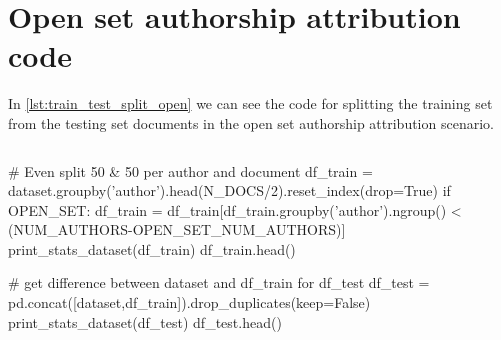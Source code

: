 \section{Open set authorship attribution code}

In \autoref{lst:train_test_split_open} we can see the code for splitting the training set from the testing set documents in the open set authorship attribution scenario.

\begin{lstlisting}[frame=none,caption={Training and Testing set split for open set autorship attribution},captionpos=b,label=lst:train_test_split_open]
\end{lstlisting}
\begin{python}	
	# Even split 50 & 50 per author and document
	df_train = dataset.groupby('author').head(N_DOCS/2).reset_index(drop=True)
	if OPEN_SET:
		df_train = df_train[df_train.groupby('author').ngroup() < (NUM_AUTHORS-OPEN_SET_NUM_AUTHORS)]
	print_stats_dataset(df_train)
	df_train.head()
	
	# get difference between dataset and df_train for df_test
	df_test = pd.concat([dataset,df_train]).drop_duplicates(keep=False)
	print_stats_dataset(df_test)
	df_test.head()
\end{python}

\listoffigures
\listoftables